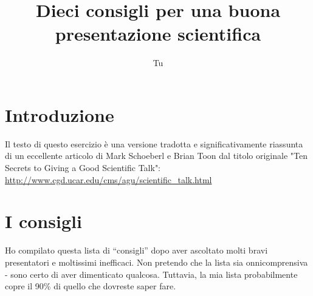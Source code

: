 \documentclass[12pt]{article}
\title{Dieci consigli per una buona presentazione scientifica}
\author{Tu}
\begin{document}
\maketitle

\section{Introduzione}

Il testo di questo esercizio \`e una versione tradotta e significativamente riassunta di un eccellente articolo di Mark Schoeberl e Brian Toon dal titolo originale "Ten Secrets to Giving a Good Scientific Talk": 
\url{http://www.cgd.ucar.edu/cms/agu/scientific_talk.html}

\section{I consigli}

Ho compilato questa lista di ``consigli'' dopo aver ascoltato molti bravi presentatori e moltissimi inefficaci. Non pretendo che la lista sia onnicomprensiva - sono certo di aver dimenticato qualcosa. Tuttavia, la mia lista probabilmente copre il 90\% di quello che dovreste saper fare.
\end{document}
